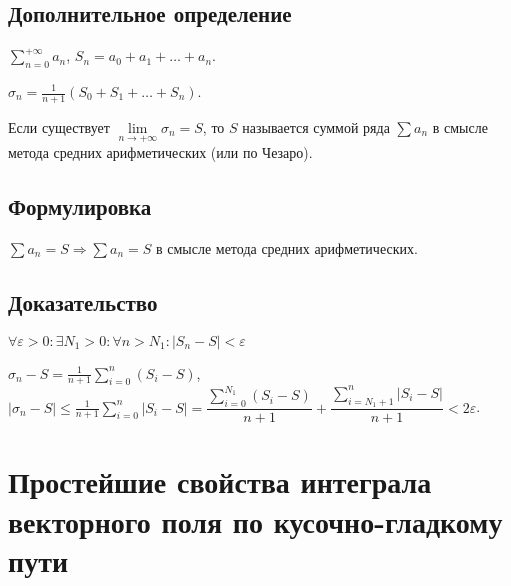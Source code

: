 \documentclass{article}
\begin{document}
        \subsection{Дополнительное определение}
        
            $\sum\limits^{+\infty}_{n = 0} a_n$, $S_n = a_0 + a_1 + \ldots + a_n$.
            
            $\sigma_n = \frac{1}{n + 1} \left( S_0 + S_1 + \ldots + S_n \right)$.
            
            Если существует $\lim\limits_{n \rightarrow +\infty} \sigma_n = S$, то $S$ называется суммой ряда $\sum a_n$ в смысле метода средних арифметических (или по Чезаро).
        
        \subsection{Формулировка}
        
            $\sum a_n = S \Rightarrow \sum a_n = S$ в смысле метода средних арифметических.
        
        \subsection{Доказательство}
        
            $\forall \varepsilon > 0 : \exists N_1 > 0 : \forall n > N_1 : \left| S_n - S \right| < \varepsilon$
            
            $\sigma_n - S = \frac{1}{n + 1} \sum\limits^n_{i = 0} \left( S_i - S \right)$, $\left| \sigma_n - S \right| \leq \frac{1}{n + 1} \sum\limits^n_{i = 0} \left| S_i - S \right| = \dfrac{\sum\limits^{N_1}_{i = 0} \left( S_i - S \right)}{n + 1} + \dfrac{\sum\limits^n_{i = N_1 + 1} \left| S_i - S \right|}{n + 1} < 2 \varepsilon$.
            
    \newpage
    
    \section{Простейшие свойства интеграла векторного поля по кусочно-гладкому пути}
    
\end{document}
